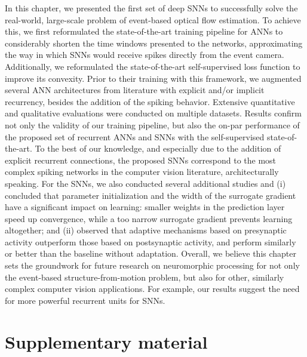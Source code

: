 In this chapter, we presented the first set of deep SNNs to successfully solve the real-world, large-scale problem of event-based optical flow estimation. To achieve this, we first reformulated the state-of-the-art training pipeline for ANNs to considerably shorten the time windows presented to the networks, approximating the way in which SNNs would receive spikes directly from the event camera. Additionally, we reformulated the state-of-the-art self-supervised loss function to improve its convexity. Prior to their training with this framework, we augmented several ANN architectures from literature with explicit and/or implicit recurrency, besides the addition of the spiking behavior. Extensive quantitative and qualitative evaluations were conducted on multiple datasets. Results confirm not only the validity of our training pipeline, but also the on-par performance of the proposed set of recurrent ANNs and SNNs with the self-supervised state-of-the-art. To the best of our knowledge, and especially due to the addition of explicit recurrent connections, the proposed SNNs correspond to the most complex spiking networks in the computer vision literature, architecturally speaking. For the SNNs, we also conducted several additional studies and (i) concluded that parameter initialization and the width of the surrogate gradient have a significant impact on learning: smaller weights in the prediction layer speed up convergence, while a too narrow surrogate gradient prevents learning altogether; and (ii) observed that adaptive mechanisms based on presynaptic activity outperform those based on postsynaptic activity, and perform similarly or better than the baseline without adaptation. Overall, we believe this chapter sets the groundwork for future research on neuromorphic processing for not only the event-based structure-from-motion problem, but also for other, similarly complex computer vision applications. For example, our results suggest the need for more powerful recurrent units for SNNs. %

\section*{Supplementary material}
\vspace{10pt}

